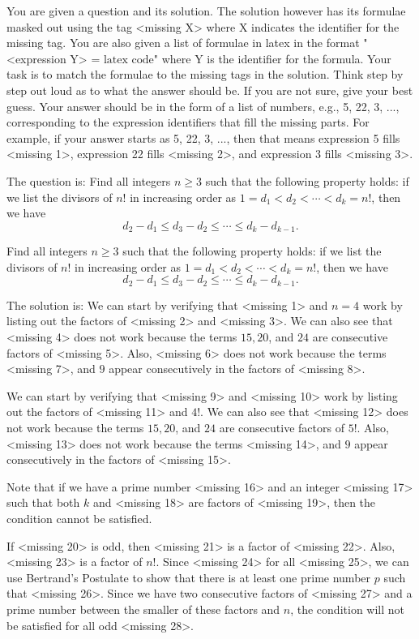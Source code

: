 \begin{tcolorbox}[breakable, title=Representative example of Olympiad task from LiveBench MATH]
You are given a question and its solution. The solution however has its formulae masked out using the tag <missing X> where X indicates the identifier for the missing tag. You are also given a list of formulae in latex in the format "<expression Y> = $\text{latex code}$" where Y is the identifier for the formula. Your task is to match the formulae to the missing tags in the solution. Think step by step out loud as to what the answer should be. If you are not sure, give your best guess. Your answer should be in the form of a list of numbers, e.g., 5, 22, 3, ..., corresponding to the expression identifiers that fill the missing parts. For example, if your answer starts as 5, 22, 3, ..., then that means expression 5 fills <missing 1>, expression 22 fills <missing 2>, and expression 3 fills <missing 3>.

The question is:
Find all integers $n \geq 3$ such that the following property holds: if we list the divisors of $n !$ in increasing order as $1=d_1<d_2<\cdots<d_k=n!$, then we have 
\[
d_2-d_1 \leq d_3-d_2 \leq \cdots \leq d_k-d_{k-1} .
\]

Find all integers $n \geq 3$ such that the following property holds: if we list the divisors of $n !$ in increasing order as $1=d_1<d_2<\cdots<d_k=n!$, then we have 
\[
d_2-d_1 \leq d_3-d_2 \leq \cdots \leq d_k-d_{k-1} .
\]

The solution is:
We can start by verifying that <missing 1> and $n=4$ work by listing out the factors of <missing 2> and <missing 3>. We can also see that <missing 4> does not work because the terms $15, 20$, and $24$ are consecutive factors of <missing 5>. Also, <missing 6> does not work because the terms <missing 7>, and $9$ appear consecutively in the factors of <missing 8>.

We can start by verifying that <missing 9> and <missing 10> work by listing out the factors of <missing 11> and $4!$. We can also see that <missing 12> does not work because the terms $15, 20$, and $24$ are consecutive factors of $5!$. Also, <missing 13> does not work because the terms <missing 14>, and $9$ appear consecutively in the factors of <missing 15>.

Note that if we have a prime number <missing 16> and an integer <missing 17> such that both $k$ and <missing 18> are factors of <missing 19>, then the condition cannot be satisfied.

If <missing 20> is odd, then <missing 21> is a factor of <missing 22>. Also, <missing 23> is a factor of $n!$. Since <missing 24> for all <missing 25>, we can use Bertrand's Postulate to show that there is at least one prime number $p$ such that <missing 26>. Since we have two consecutive factors of <missing 27> and a prime number between the smaller of these factors and $n$, the condition will not be satisfied for all odd <missing 28>.


\end{tcolorbox}
